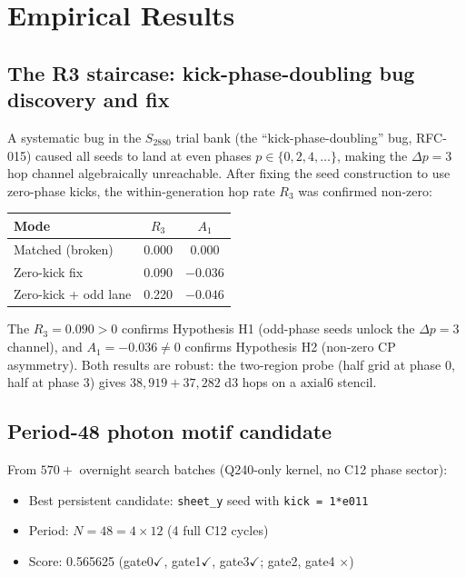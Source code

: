 \documentclass[11pt,a4paper]{article}
\theoremstyle{remark}
\begin{document}
\section{Empirical Results}
\label{sec:empirical}

\subsection{The R3 staircase: kick-phase-doubling bug discovery and fix}

A systematic bug in the $S_{2880}$ trial bank (the ``kick-phase-doubling'' bug, RFC-015)
caused all seeds to land at even phases $p \in \{0, 2, 4, \ldots\}$, making the $\Delta p = 3$
hop channel algebraically unreachable.  After fixing the seed construction to use
zero-phase kicks, the within-generation hop rate $R_3$ was confirmed non-zero:

\begin{center}
\begin{tabular}{lcc}
  \toprule
  Mode & $R_3$ & $A_1$ \\
  \midrule
  Matched (broken) & 0.000 & 0.000 \\
  Zero-kick fix    & 0.090 & $-0.036$ \\
  Zero-kick + odd lane & 0.220 & $-0.046$ \\
  \bottomrule
\end{tabular}
\end{center}

The $R_3 = 0.090 > 0$ confirms Hypothesis H1 (odd-phase seeds unlock the $\Delta p = 3$
channel), and $A_1 = -0.036 \neq 0$ confirms Hypothesis H2 (non-zero CP asymmetry).
Both results are robust: the two-region probe (half grid at phase 0, half at phase 3)
gives $38{,}919 + 37{,}282$ d3 hops on a $\mathrm{axial6}$ stencil.

\subsection{Period-48 photon motif candidate}

From $570+$ overnight search batches (Q240-only kernel, no C12 phase sector):
\begin{itemize}
  \item Best persistent candidate: \texttt{sheet\_y} seed with \texttt{kick = 1*e011}
  \item Period: $N = 48 = 4 \times 12$ (4 full C12 cycles)
  \item Score: 0.565625 (gate0$\checkmark$, gate1$\checkmark$, gate3$\checkmark$; gate2, gate4 $\times$)
\end{itemize}
\end{document}
